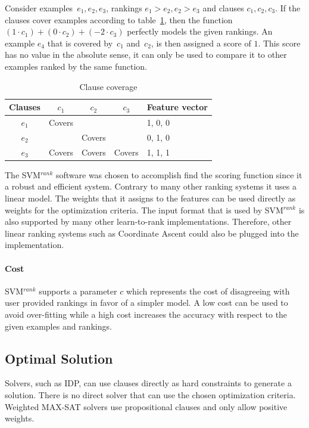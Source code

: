 \documentclass{llncs}
\newcommand{\svm}{SVM$^{rank}$}
\begin{document}
\begin{example}
  Consider examples~$e_1, e_2, e_3$, rankings $e_1 > e_2, e_2 > e_3$ and clauses $c_1, c_2, c_3$.
  If the clauses cover examples according to table~\ref{tbl:cover_examples}, then the function $(1 \cdot c_1) + (0\cdot c_2) + (-2\cdot c_3)$ perfectly models the given rankings.
  An example $e_4$ that is covered by~$c_1$ and~$c_2$, is then assigned a score of $1$.
  This score has no value in the absolute sense, it can only be used to compare it to other examples ranked by the same function.

  \begin{table}[!htp]
  \label{tbl:cover_examples}
  \begin{tabularx}{\textwidth}{c|ccc|X}
    \textbf{Clauses}  &$c_1$    & $c_2$   & $c_3$   & \textbf{Feature vector}\\
    \toprule
    $e_1$         & Covers  &       &       & 1, 0, 0\\
    $e_2$         &       & Covers  &       & 0, 1, 0\\
    $e_3$         & Covers  & Covers  & Covers  & 1, 1, 1\\
  \end{tabularx}
  \caption{Clause coverage}
  \end{table}
\end{example}

The \svm{} software was chosen to accomplish find the scoring function since it a robust and efficient system.
Contrary to many other ranking systems it uses a linear model.
The weights that it assigns to the features can be used directly as weights for the optimization criteria.
The input format that is used by \svm{} is also supported by many other learn-to-rank implementations.
Therefore, other linear ranking systems such as Coordinate Ascent \cite{metzler2007linear} could also be plugged into the implementation.

\paragraph{Cost}
\svm{} supports a parameter $c$ which represents the cost of disagreeing with user provided rankings in favor of a simpler model.
A low cost can be used to avoid over-fitting while a high cost increases the accuracy with respect to the given examples and rankings.

\subsection{Optimal Solution}
Solvers, such as IDP, can use clauses directly as hard constraints to generate a solution.
There is no direct solver that can use the chosen optimization criteria.
Weighted MAX-SAT solvers use propositional clauses and only allow positive weights.
\end{document}
